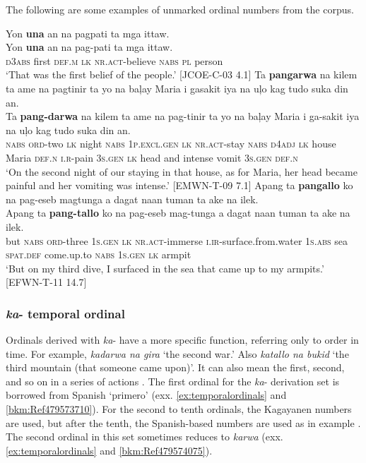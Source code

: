 The following are some examples of unmarked ordinal numbers from the corpus.

\ea
\label{bkm:Ref479573487}
Yon  \textbf{una}  an  na  pagpati  ta  mga  ittaw. \\\smallskip
 \gll Yon  \textbf{una}  an  na  pag-pati  ta  mga  ittaw. \\
\textsc{d}3\textsc{abs}  first  \textsc{def.m}  \textsc{lk}  \textsc{nr.act}-believe  \textsc{nabs}  \textsc{pl}  person \\
\glt ‘That was the first belief of the people.’ [JCOE-C-03 4.1]
\z
\ea
Ta  \textbf{pangarwa}  na  kilem  ta  ame  na  pagtinir  ta  yo na  baļay  Maria  i  gasakit  iya  na  uļo  kag  tudo  suka  din  an. \\\smallskip
 \gll Ta  \textbf{pang-darwa}  na  kilem  ta  ame  na  pag-tinir  ta  yo na  baļay  Maria  i  ga-sakit  iya  na  uļo  kag  tudo  suka  din  an. \\
   \textsc{nabs}  \textsc{ord}-two  \textsc{lk}  night  \textsc{nabs}  1\textsc{p.excl.gen}  \textsc{lk}  \textsc{nr.act}-stay  \textsc{nabs}
 \textsc{d}4\textsc{adj}
\textsc{lk}  house  Maria  \textsc{def.n}  \textsc{i.r}-pain  3\textsc{s.gen}  \textsc{lk}  head  and  intense  vomit  3\textsc{s.gen}  \textsc{def.n} \\
\glt `On the second night of our staying in that house, as for Maria, her head became painful and her vomiting was intense.’ [EMWN-T-09 7.1]
\z
\ea
Apang  ta  \textbf{pangallo}  ko  na  pag-eseb magtunga a  dagat  naan  tuman  ta  ake  na  ilek. \\\smallskip
 \gll Apang  ta  \textbf{pang-tallo}  ko  na  pag-eseb mag-tunga a  dagat  naan  tuman  ta  ake  na  ilek. \\
but  \textsc{nabs}  \textsc{ord}-three  1\textsc{s.gen}  \textsc{lk}  \textsc{nr.act}-immerse \textsc{i.ir}-surface.from.water 1\textsc{s.abs}  sea  \textsc{spat.def}  come.up.to  \textsc{nabs}  1\textsc{s.gen}  \textsc{lk}  armpit \\
\glt `But on my third dive, I surfaced in the sea that came up to my armpits.’ [EFWN-T-11 14.7]
\z

\subsubsection{\textit{ka}{}- temporal ordinal}
\label{sec:temporalordinalnumbers}

Ordinals derived with \textit{ka}{}- have a more specific function, referring only to order in time. For example, \textit{kadarwa na gira} ‘the second war.’ Also \textit{katallo na bukid} ‘the third mountain (that someone came upon)’. It can also mean the first, second, and so on in a series of actions . The first ordinal for the \textit{ka}{}- derivation set is borrowed from Spanish ‘primero’ (exx. \ref{ex:temporalordinals} and \ref{bkm:Ref479573710}). For the second to tenth ordinals, the Kagayanen numbers are used, but after the tenth, the Spanish-based numbers are used as in example . The second ordinal in this set sometimes reduces to \textit{karwa} (exx. \ref{ex:temporalordinals} and \ref{bkm:Ref479574075}).

